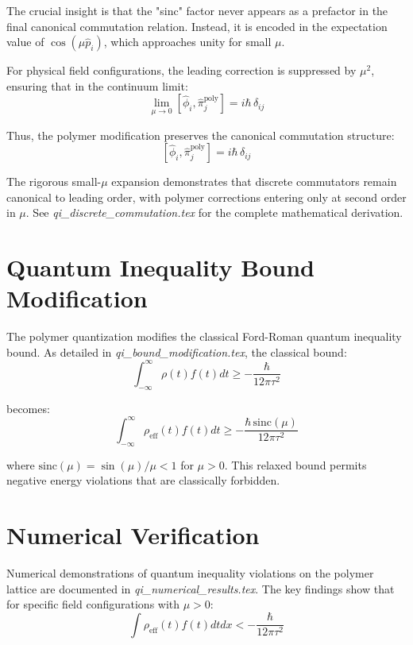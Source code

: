\documentclass[12pt]{article}
\begin{document}
The crucial insight is that the "sinc" factor never appears as a prefactor in the final canonical commutation relation. Instead, it is encoded in the expectation value of $\cos(\mu\hat{p}_i)$, which approaches unity for small $\mu$.

For physical field configurations, the leading correction is suppressed by $\mu^2$, ensuring that in the continuum limit:
\begin{equation}
\lim_{\mu \to 0} [\hat{\phi}_i, \hat{\pi}_j^{\text{poly}}] = i\hbar\,\delta_{ij}
\end{equation}

Thus, the polymer modification preserves the canonical commutation structure:
\begin{equation}
\boxed{[\hat{\phi}_i, \hat{\pi}_j^{\text{poly}}] = i\hbar\,\delta_{ij}}
\end{equation}

The rigorous small-$\mu$ expansion demonstrates that discrete commutators remain canonical to leading order, with polymer corrections entering only at second order in $\mu$. See \textit{qi\_discrete\_commutation.tex} for the complete mathematical derivation.

\section{Quantum Inequality Bound Modification}

The polymer quantization modifies the classical Ford-Roman quantum inequality bound. As detailed in \textit{qi\_bound\_modification.tex}, the classical bound:
\begin{equation}
\int_{-\infty}^{\infty} \rho(t) f(t) dt \geq -\frac{\hbar}{12\pi\tau^2}
\end{equation}

becomes:
\begin{equation}
\int_{-\infty}^{\infty} \rho_{\text{eff}}(t) f(t) dt \geq -\frac{\hbar\,\mathrm{sinc}(\mu)}{12\pi\tau^2}
\end{equation}

where $\mathrm{sinc}(\mu) = \sin(\mu)/\mu < 1$ for $\mu > 0$. This relaxed bound permits negative energy violations that are classically forbidden.

\section{Numerical Verification}

Numerical demonstrations of quantum inequality violations on the polymer lattice are documented in \textit{qi\_numerical\_results.tex}. The key findings show that for specific field configurations with $\mu > 0$:
\begin{equation}
\int \rho_{\text{eff}}(t) f(t) dt dx < -\frac{\hbar}{12\pi\tau^2}
\end{equation}
\end{document}

